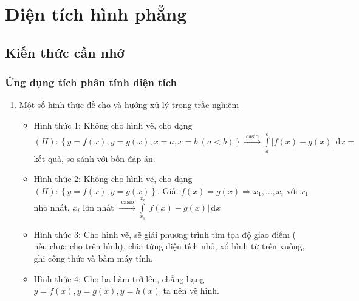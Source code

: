 \setcounter{section}{43}
\setcounter{ex}{0}
\section{Diện tích hình phẳng}
\subsection{Kiến thức cần nhớ}
\begin{khung}
\subsubsection{Ứng dụng tích phân tính diện tích}
	\begin{enumerate}
		\item Một số hình thức đề cho và hướng xử lý trong trắc nghiệm
		\begin{itemize}
			\item Hình thức 1: Không cho hình vẽ, cho dạng $(H) : \left\{y=f(x), y=g(x), x=a, x=b\ (a<b)\right\}\xrightarrow{\text{ casio }}\displaystyle\int\limits_{a}^{b}\left|f(x)-g(x) \right|\mathrm{\,d}x =$ kết quả, so sánh với bốn đáp án.
			\item Hình thức 2: Không cho hình vẽ, cho dạng $(H):\left\{y=f(x), y=g(x)\right\}$. Giải  $f(x)=g(x)\Rightarrow x_1, \ldots, x_i$ với $x_1$ nhỏ nhất, $x_i$ lớn nhất  $\xrightarrow{\text{ casio }}\displaystyle\int\limits_{x_1}^{x_i}\left|f(x)-g(x) \right|\mathrm{\,d}x $
			\item Hình thức 3:  Cho hình vẽ, sẽ giải phương trình tìm tọa độ giao điểm  ( nếu chưa cho trên hình), chia từng diện tích nhỏ, xổ hình từ trên xuống, ghi công thức và bấm máy tính. 
			\item Hình thức 4: Cho ba hàm trở lên, chẳng hạng $y=f(x), y=g(x), y=h(x)$ ta nên vẽ hình.
		\end{itemize} 
	\end{enumerate}

\end{khung}
